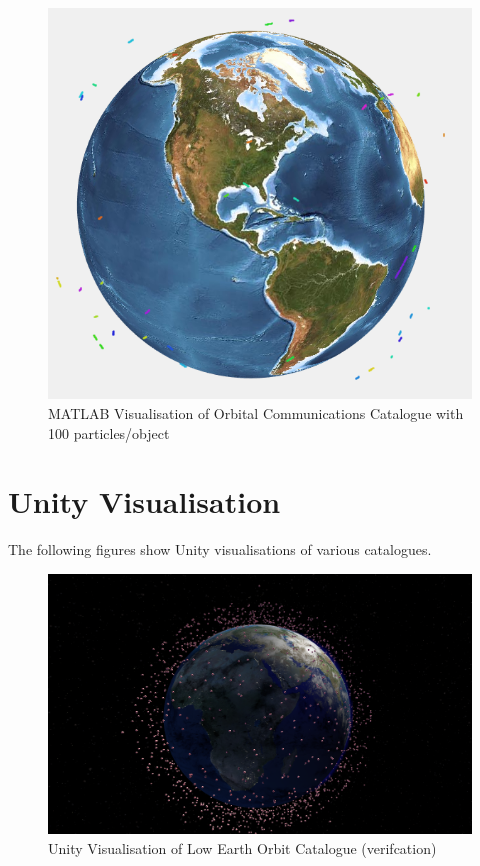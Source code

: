 \documentclass[12pt,openany,a4paper]{book}
\begin{document}
			\begin{figure}[H]
				\centering
				\caption{MATLAB Visualisation of Orbital Communications Catalogue with 100 particles/object}
				\label{cComms}
				\includegraphics[scale=0.6]{p100Comm.png}
			\end{figure}
		
		\section{Unity Visualisation}
		
		The following figures show Unity visualisations of various catalogues.
		
				\begin{figure}[H]
					\centering
					\caption{Unity Visualisation of Low Earth Orbit Catalogue (verifcation)}
					\label{unityLEO}
					\includegraphics[scale=0.4]{uLEO.png}
				\end{figure}
				
\end{document}
